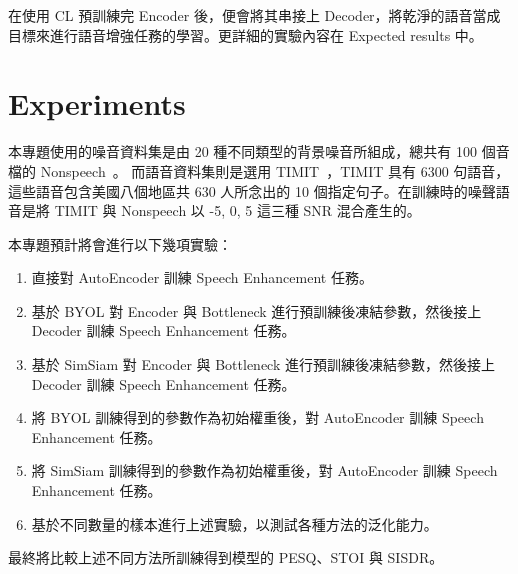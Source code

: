 \documentclass[10pt,twocolumn,letterpaper]{article}
\begin{document}
\begin{CJK}{UTF8}{bkai}
   在使用 CL 預訓練完 Encoder 後，便會將其串接上
   Decoder，將乾淨的語音當成目標來進行語音增強任務的學習。更詳細的實驗內容在 Expected results 中。


   \section{Experiments}
   本專題使用的噪音資料集是由 20 種不同類型的背景噪音所組成，總共有 100 個音檔的 Nonspeech~\cite{Nonspeech}。
   而語音資料集則是選用 TIMIT~\cite{TIMIT}，TIMIT 具有 6300 句語音，這些語音包含美國八個地區共 630 人所念出的 10
   個指定句子。在訓練時的噪聲語音是將 TIMIT 與 Nonspeech 以 -5, 0, 5 這三種 SNR 混合產生的。



   本專題預計將會進行以下幾項實驗：
   \begin{enumerate}
      \item 直接對 AutoEncoder 訓練 Speech Enhancement 任務。
      \item 基於 BYOL 對 Encoder 與 Bottleneck 進行預訓練後凍結參數，然後接上 Decoder 訓練 Speech Enhancement 任務。
      \item 基於 SimSiam 對 Encoder 與 Bottleneck 進行預訓練後凍結參數，然後接上 Decoder 訓練 Speech Enhancement 任務。
      \item 將 BYOL 訓練得到的參數作為初始權重後，對 AutoEncoder 訓練 Speech Enhancement 任務。
      \item 將 SimSiam 訓練得到的參數作為初始權重後，對 AutoEncoder 訓練 Speech Enhancement 任務。
      \item 基於不同數量的樣本進行上述實驗，以測試各種方法的泛化能力。
   \end{enumerate}

   最終將比較上述不同方法所訓練得到模型的 PESQ\cite{PESQ}、STOI\cite{STOI} 與 SISDR\cite{SISDR}。



\end{CJK}
\end{document}
